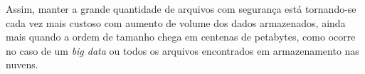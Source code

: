 	Assim, manter a grande quantidade de arquivos com segurança está tornando-se cada vez mais custoso com aumento de volume dos dados armazenados, ainda mais quando a ordem de tamanho chega em centenas de petabytes, como ocorre no caso de um \textit{big data} ou todos os arquivos encontrados em armazenamento nas nuvens. 
	
	

	
	
	
	

 

	

